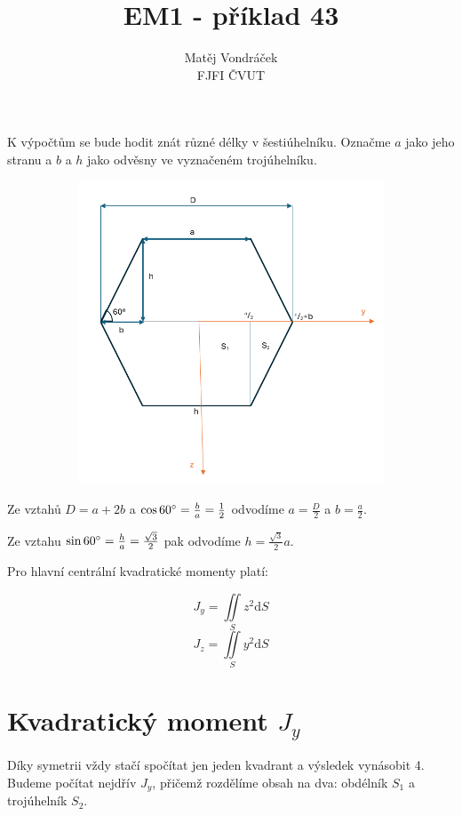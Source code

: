 \documentclass{article}
\title{EM1 - příklad 43}
\author{Matěj Vondráček \\ FJFI ČVUT}
\begin{document}
\maketitle

K výpočtům se bude hodit znát různé délky v šestiúhelníku. Označme $a$ jako jeho stranu a $b$ a $h$ jako odvěsny ve vyznačeném trojúhelníku. 

\begin{figure}[h]    
    \begin{subfigure}[b]{0.7\textwidth}
        \includegraphics[width=\textwidth]{pic.png}
    \end{subfigure}
\end{figure}

Ze vztahů $D=a+2b$ a $\cos{60\degree}=\frac{b}{a}=\frac{1}{2}$ odvodíme $a=\frac{D}{2}$ a $b=\frac{a}{2}$.

Ze vztahu $\sin{60\degree}=\frac{h}{a}=\frac{\sqrt{3}}{2}$ pak odvodíme $h=\frac{\sqrt{3}}{2}a$.

\bigskip

Pro hlavní centrální kvadratické momenty platí:

\[ J_y=\iint\limits_{S} z^2\mathrm{d}S \] 
\[ J_z=\iint\limits_{S} y^2\mathrm{d}S \] 

\section{Kvadratický moment $J_y$}
Díky symetrii vždy stačí spočítat jen jeden kvadrant a výsledek vynásobit 4. Budeme počítat nejdřív $J_y$, přičemž rozdělíme obsah na dva: obdélník $S_1$ a trojúhelník $S_2$.
\end{document}
